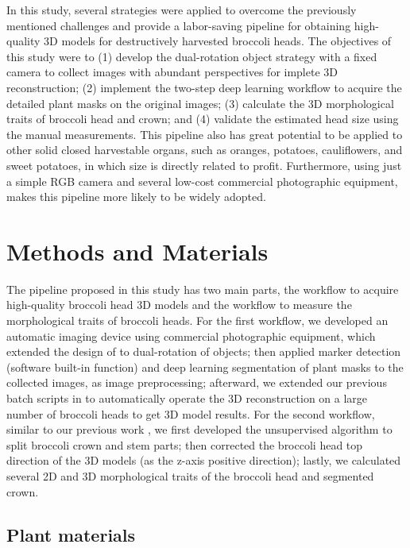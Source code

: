 In this study, several strategies were applied to overcome the previously mentioned challenges and provide a labor-saving pipeline for obtaining high-quality 3D models for destructively harvested broccoli heads. The objectives of this study were to (1) develop the dual-rotation object strategy with a fixed camera to collect images with abundant perspectives for implete 3D reconstruction; (2) implement the two-step deep learning workflow to acquire the detailed plant masks on the original images; (3) calculate the 3D morphological traits of broccoli head and crown; and (4) validate the estimated head size using the manual measurements. This pipeline also has great potential to be applied to other solid closed harvestable organs, such as oranges, potatoes, cauliflowers, and sweet potatoes, in which size is directly related to profit. Furthermore, using just a simple RGB camera and several low-cost commercial photographic equipment, makes this pipeline more likely to be widely adopted.


\section{Methods and Materials}

The pipeline proposed in this study has two main parts, the workflow to acquire high-quality broccoli head 3D models and the workflow to measure the morphological traits of broccoli heads. For the first workflow, we developed an automatic imaging device using commercial photographic equipment, which extended the design of \citet{kochi_3d_2018} to dual-rotation of objects; then applied marker detection (software built-in function) and deep learning segmentation of plant masks to the collected images, as image preprocessing; afterward, we extended our previous batch scripts in \citet{feldman_easydcp_2021} to automatically operate the 3D reconstruction on a large number of broccoli heads to get 3D model results. For the second workflow, similar to our previous work \citep{feldman_easydcp_2021}, we first developed the unsupervised algorithm to split broccoli crown and stem parts; then corrected the broccoli head top direction of the 3D models (as the z-axis positive direction); lastly, we calculated several 2D and 3D morphological traits of the broccoli head and segmented crown.

\subsection{Plant materials}

